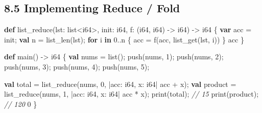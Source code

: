 \documentclass[
  english,
]{book}
\newenvironment{Shaded}{\begin{snugshade}}{\end{snugshade}}
\newcommand{\CommentTok}[1]{\textcolor[rgb]{0.42,0.60,0.33}{\textit{#1}}}
\newcommand{\ControlFlowTok}[1]{\textcolor[rgb]{0.77,0.53,0.75}{\textbf{#1}}}
\newcommand{\DataTypeTok}[1]{\textcolor[rgb]{0.31,0.79,0.69}{#1}}
\newcommand{\DecValTok}[1]{\textcolor[rgb]{0.71,0.81,0.66}{#1}}
\newcommand{\FunctionTok}[1]{\textcolor[rgb]{0.86,0.86,0.67}{#1}}
\newcommand{\KeywordTok}[1]{\textcolor[rgb]{0.34,0.61,0.84}{\textbf{#1}}}
\newcommand{\NormalTok}[1]{\textcolor[rgb]{0.83,0.83,0.83}{#1}}
\newcommand{\OperatorTok}[1]{\textcolor[rgb]{0.83,0.83,0.83}{#1}}
\begin{document}
\subsection{8.5 Implementing Reduce /
Fold}\label{implementing-reduce-fold}

\begin{Shaded}
\begin{Highlighting}[]
\KeywordTok{def} \FunctionTok{list\_reduce}\NormalTok{(lst: }\DataTypeTok{list}\OperatorTok{\textless{}}\DataTypeTok{i64}\OperatorTok{\textgreater{}}\NormalTok{, init: }\DataTypeTok{i64}\NormalTok{, f: (}\DataTypeTok{i64}\NormalTok{, }\DataTypeTok{i64}\NormalTok{) }\OperatorTok{{-}\textgreater{}} \DataTypeTok{i64}\NormalTok{) }\OperatorTok{{-}\textgreater{}} \DataTypeTok{i64}\NormalTok{ \{}
    \KeywordTok{var}\NormalTok{ acc }\OperatorTok{=}\NormalTok{ init;}
    \KeywordTok{val}\NormalTok{ n }\OperatorTok{=} \FunctionTok{list\_len}\NormalTok{(lst);}
    \ControlFlowTok{for}\NormalTok{ i }\ControlFlowTok{in} \DecValTok{0}\OperatorTok{..}\NormalTok{n \{}
\NormalTok{        acc }\OperatorTok{=}\NormalTok{ f(acc, }\FunctionTok{list\_get}\NormalTok{(lst, i))}
\NormalTok{    \}}
\NormalTok{    acc}
\NormalTok{\}}

\KeywordTok{def}\NormalTok{ main() }\OperatorTok{{-}\textgreater{}} \DataTypeTok{i64}\NormalTok{ \{}
    \KeywordTok{val}\NormalTok{ nums }\OperatorTok{=} \DataTypeTok{list}\NormalTok{();}
    \FunctionTok{push}\NormalTok{(nums, }\DecValTok{1}\NormalTok{);}
    \FunctionTok{push}\NormalTok{(nums, }\DecValTok{2}\NormalTok{);}
    \FunctionTok{push}\NormalTok{(nums, }\DecValTok{3}\NormalTok{);}
    \FunctionTok{push}\NormalTok{(nums, }\DecValTok{4}\NormalTok{);}
    \FunctionTok{push}\NormalTok{(nums, }\DecValTok{5}\NormalTok{);}

    \KeywordTok{val}\NormalTok{ total }\OperatorTok{=} \FunctionTok{list\_reduce}\NormalTok{(nums, }\DecValTok{0}\NormalTok{, }\OperatorTok{|}\NormalTok{acc: }\DataTypeTok{i64}\NormalTok{, x: }\DataTypeTok{i64}\OperatorTok{|}\NormalTok{ acc }\OperatorTok{+}\NormalTok{ x);}
    \KeywordTok{val}\NormalTok{ product }\OperatorTok{=} \FunctionTok{list\_reduce}\NormalTok{(nums, }\DecValTok{1}\NormalTok{, }\OperatorTok{|}\NormalTok{acc: }\DataTypeTok{i64}\NormalTok{, x: }\DataTypeTok{i64}\OperatorTok{|}\NormalTok{ acc }\OperatorTok{*}\NormalTok{ x);}
    \FunctionTok{print}\NormalTok{(total);    }\CommentTok{// 15}
    \FunctionTok{print}\NormalTok{(product);  }\CommentTok{// 120}
    \DecValTok{0}
\NormalTok{\}}
\end{Highlighting}
\end{Shaded}
\end{document}
